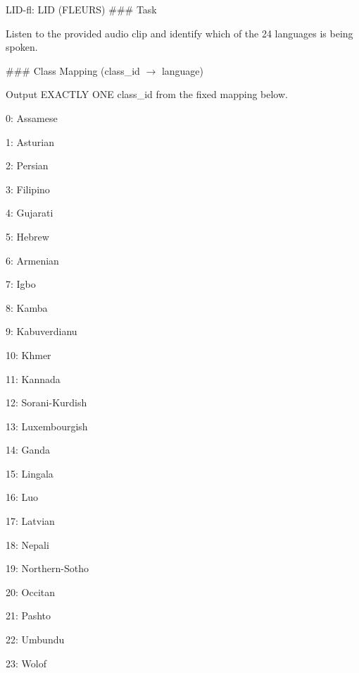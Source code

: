 {\begin{promptbox}{LID-fl: LID (FLEURS)}
\noindent\#\#\# Task
\par
Listen to the provided audio clip and identify which of the 24 languages is being spoken.
\par\vspace{2pt}

\noindent\#\#\# Class Mapping (class\_id \(\rightarrow\) language)
\par
Output EXACTLY ONE class\_id from the fixed mapping below.
\par\vspace{2pt}

\hspace*{1em}0: Assamese\par
\hspace*{1em}1: Asturian\par
\hspace*{1em}2: Persian\par
\hspace*{1em}3: Filipino\par
\hspace*{1em}4: Gujarati\par
\hspace*{1em}5: Hebrew\par
\hspace*{1em}6: Armenian\par
\hspace*{1em}7: Igbo\par
\hspace*{1em}8: Kamba\par
\hspace*{1em}9: Kabuverdianu\par
\hspace*{1em}10: Khmer\par
\hspace*{1em}11: Kannada\par
\hspace*{1em}12: Sorani-Kurdish\par
\hspace*{1em}13: Luxembourgish\par
\hspace*{1em}14: Ganda\par
\hspace*{1em}15: Lingala\par
\hspace*{1em}16: Luo\par
\hspace*{1em}17: Latvian\par
\hspace*{1em}18: Nepali\par
\hspace*{1em}19: Northern-Sotho\par
\hspace*{1em}20: Occitan\par
\hspace*{1em}21: Pashto\par
\hspace*{1em}22: Umbundu\par
\hspace*{1em}23: Wolof
\par\vspace{2pt}


\end{promptbox}}
